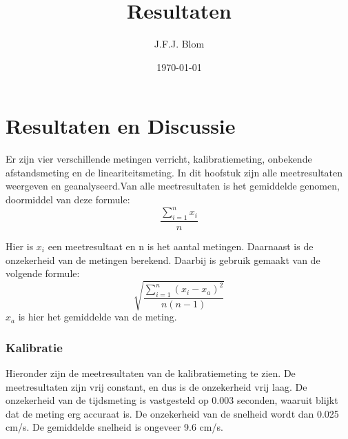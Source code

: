 \documentclass{report}
\title{Resultaten}
\author{J.F.J. Blom}
\date{\today}
\begin{document}
\chapter{Resultaten en Discussie}
Er zijn vier verschillende metingen verricht, kalibratiemeting, onbekende afstandsmeting en de lineariteitsmeting. In dit hoofstuk zijn alle meetresultaten weergeven en geanalyseerd.Van alle meetresultaten is het gemiddelde genomen, doormiddel van deze formule:
\begin{equation}
\frac{\sum_{i=1}^{n}x_i}{n}
\end{equation}

Hier is $x_i$ een meetresultaat en n is het aantal metingen. 
Daarnaast is de onzekerheid van de metingen berekend. Daarbij is gebruik gemaakt van de volgende formule:
\begin{equation}
\sqrt{\frac{\sum_{i=1}^{n}( x_i-x_a)^2}{n(n-1)}}
\end{equation}
$x_a$ is hier het gemiddelde van de meting.
\subsection*{Kalibratie}
Hieronder zijn de meetresultaten van de kalibratiemeting te zien. De meetresultaten zijn vrij constant, en dus is de onzekerheid vrij laag. De onzekerheid van de tijdsmeting is vastgesteld op 0.003 seconden, waaruit blijkt dat de meting erg accuraat is. De onzekerheid van de snelheid wordt dan 0.025 cm/s. De gemiddelde snelheid is ongeveer 9.6 cm/s.
\end{document}
